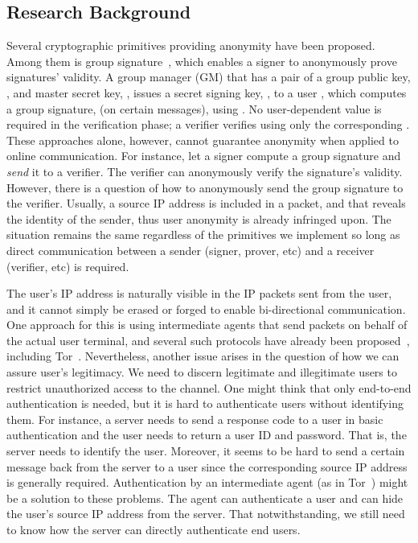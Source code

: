\documentclass[preprint]{sig-alternate}
\begin{document}
\subsection{Research Background}


Several cryptographic primitives providing anonymity have been proposed. 
Among them is group signature~\cite{[ChaumH91]}, which enables a signer to anonymously prove signatures' validity.
A group manager (GM) that has a pair of a group public key, , and master secret key, , issues a secret signing key, , to a user , which computes a group signature,  (on certain messages), using . 
No user-dependent value is required in the verification phase; a verifier verifies  using only the corresponding . 
These approaches alone, however, cannot guarantee anonymity when applied to online communication.
For instance, let a signer compute a group signature and \emph{send} it to a verifier. 
The verifier can anonymously verify the signature's validity. 
However, there is a question of how to anonymously send the group signature to the verifier. 
Usually, a source IP address is included in a packet, and that reveals the identity of the sender, thus user anonymity is already infringed upon.
The situation remains the same regardless of the primitives we implement so long as direct communication between a sender (signer, prover, etc) and a receiver (verifier, etc) is required. 


The user's IP address is naturally visible in the IP packets sent from the user, and it cannot simply be erased or forged to enable bi-directional communication. 
One approach for this is using intermediate agents that send packets on behalf of the actual user terminal, and several such protocols have already been proposed~\cite{SPA}, including Tor~\cite{TorProject}. 
Nevertheless, another issue arises in the question of how we can assure user's legitimacy. 
We need to discern legitimate and illegitimate users to restrict unauthorized access to the channel.
One might think that only end-to-end authentication is needed, but it is hard to authenticate users without identifying them.
For instance, a server needs to send a response code to a user in basic authentication and the user needs to return a user ID and password.
That is, the server needs to identify the user.
Moreover, it seems to be hard to send a certain message back from the server to a user since the corresponding source IP address is generally required. 
Authentication by an intermediate agent (as in Tor~\cite{TorProject}) might be a solution to these problems.
The agent can authenticate a user and can hide the user's source IP address from the server. 
That notwithstanding, we still need to know how the server can directly authenticate end users. 
\end{document}

